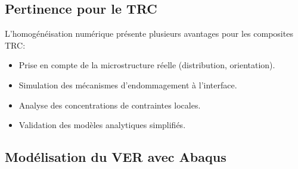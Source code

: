 \documentclass{rapportECL}
\begin{document}
\subsection{Pertinence pour le TRC}
\begin{center}
\begin{minipage}{0.9\textwidth}
\begin{framed}
\noindent L'homogénéisation numérique présente plusieurs avantages pour les composites TRC:
\begin{itemize}
\item Prise en compte de la microstructure réelle (distribution, orientation).
\item Simulation des mécanismes d'endommagement à l'interface.
\item Analyse des concentrations de contraintes locales.
\item Validation des modèles analytiques simplifiés.
\end{itemize}
\end{framed}
\end{minipage}
\end{center}

\vspace{20pt}

\subsection{Modélisation du VER avec Abaqus}
\end{document}
